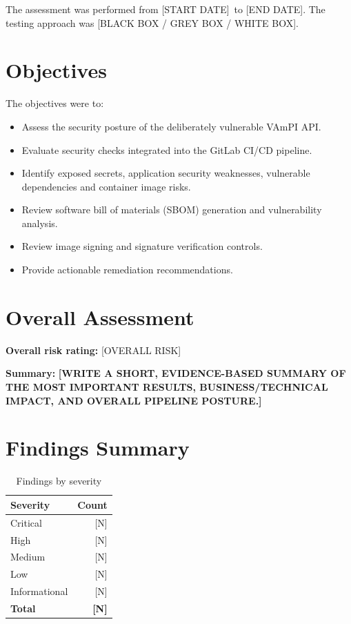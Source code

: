 \documentclass[11pt,a4paper]{report}
\newcommand{\AssessmentStart}{[START DATE]}
\newcommand{\AssessmentEnd}{[END DATE]}
\newcommand{\OverallRisk}{[OVERALL RISK]}
\newcommand{\TestingType}{[BLACK BOX / GREY BOX / WHITE BOX]}
\newcommand{\CriticalCount}{[N]}
\newcommand{\HighCount}{[N]}
\newcommand{\MediumCount}{[N]}
\newcommand{\LowCount}{[N]}
\newcommand{\InfoCount}{[N]}
\newcommand{\TotalFindings}{[N]}
\newcommand{\placeholder}[1]{\textbf{[#1]}}
\begin{document}
The assessment was performed from \AssessmentStart\ to \AssessmentEnd.
The testing approach was \TestingType.

\section{Objectives}
The objectives were to:
\begin{itemize}
    \item Assess the security posture of the deliberately vulnerable VAmPI API.
    \item Evaluate security checks integrated into the GitLab CI/CD pipeline.
    \item Identify exposed secrets, application security weaknesses, vulnerable
          dependencies and container image risks.
    \item Review software bill of materials (SBOM) generation and vulnerability
          analysis.
    \item Review image signing and signature verification controls.
    \item Provide actionable remediation recommendations.
\end{itemize}

\section{Overall Assessment}
\textbf{Overall risk rating:} \OverallRisk

\textbf{Summary:} \placeholder{WRITE A SHORT, EVIDENCE-BASED SUMMARY OF THE
MOST IMPORTANT RESULTS, BUSINESS/TECHNICAL IMPACT, AND OVERALL PIPELINE POSTURE.}

\section{Findings Summary}
\begin{table}[H]
\centering
\caption{Findings by severity}
\begin{tabularx}{0.85\textwidth}{@{}Y r@{}}
    \toprule
    \textbf{Severity} & \textbf{Count} \\
    \midrule
    Critical & \CriticalCount \\
    High & \HighCount \\
    Medium & \MediumCount \\
    Low & \LowCount \\
    Informational & \InfoCount \\
    \midrule
    \textbf{Total} & \textbf{\TotalFindings} \\
    \bottomrule
\end{tabularx}
\end{table}
\end{document}
